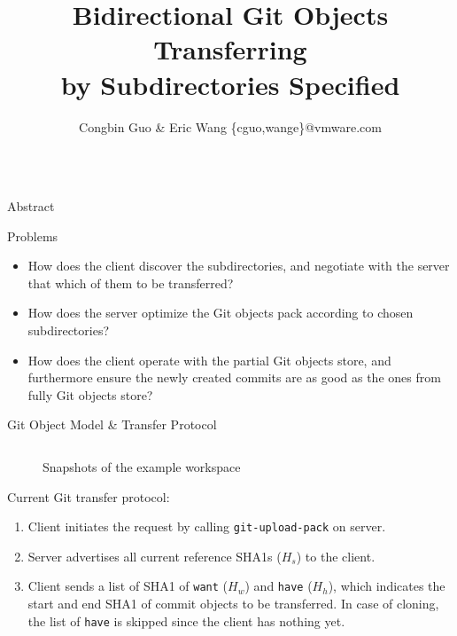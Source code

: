 \documentclass[final]{beamer}
\title{Bidirectional Git Objects Transferring\\ by Subdirectories Specified}
\author{Congbin Guo \& Eric Wang \{cguo,wange\}@vmware.com}
\institute{VMware Inc.}
\begin{document}
\begin{frame}[t, fragile]
  \begin{columns}[t]
    \begin{column}{.49\linewidth}
      \begin{block}{Abstract}
        
      \end{block}
      \begin{block}{Problems}
\begin{itemize}
    \justifying
  \item How does the client discover the subdirectories, and negotiate with
      the server that which of them to be transferred?

  \item How does the server optimize the Git objects pack according to chosen
      subdirectories?

  \item How does the client operate with the partial Git objects store, and
      furthermore ensure the newly created commits are as good as the ones
      from fully Git objects store?
\end{itemize}
      \end{block}
      \begin{block}{Git Object Model \& Transfer Protocol}
        \begin{columns}[T]
          \begin{column}{.5\textwidth}
              \begin{figure}\centering
                \caption{Snapshots of the example workspace}
              \end{figure}
            Current Git transfer protocol:
\begin{enumerate}
    \justifying
  \item Client initiates the request by calling \verb|git-upload-pack| on
    server.

  \item Server advertises all current reference SHA1s ($H_s$) to the client.

  \item Client sends a list of SHA1 of \verb|want| ($H_w$) and \verb|have|
    ($H_h$), which indicates the start and end SHA1 of commit objects to be
    transferred.
    In case of cloning, the list of \verb|have| is skipped since the client has
    nothing yet.


\end{enumerate}
\end{column}
\end{columns}
\end{block}
\end{column}
\end{columns}
\end{frame}
\end{document}
